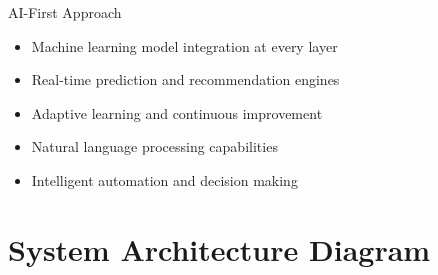 \begin{sprintbox}{AI-First Approach}
\begin{itemize}
    \item Machine learning model integration at every layer
    \item Real-time prediction and recommendation engines
    \item Adaptive learning and continuous improvement
    \item Natural language processing capabilities
    \item Intelligent automation and decision making
\end{itemize}
\end{sprintbox}

\section{System Architecture Diagram}

